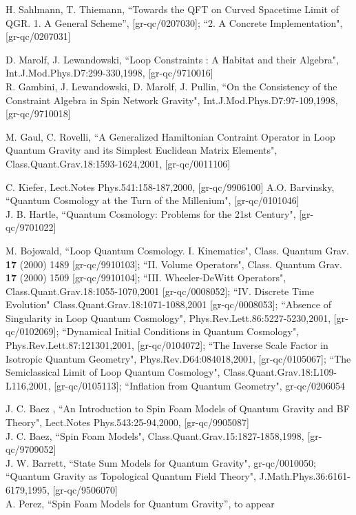 \documentclass[12pt]{report}
\begin{document}
\begin{thebibliography}{99}
 H. Sahlmann, T. Thiemann, ``Towards the QFT on 
Curved Spacetime Limit of QGR. 1. A General Scheme'', [gr-qc/0207030];
``2. A Concrete Implementation", [gr-qc/0207031]  

 D. Marolf, J. Lewandowski, ``Loop Constraints : A Habitat
and their Algebra", Int.J.Mod.Phys.D7:299-330,1998, [gr-qc/9710016]\\
R. Gambini, J. Lewandowski, D. Marolf, J. Pullin, ``On the
Consistency of the Constraint Algebra in Spin Network Gravity",
Int.J.Mod.Phys.D7:97-109,1998, [gr-qc/9710018]

M. Gaul, C. Rovelli, ``A Generalized Hamiltonian Contraint
Operator in Loop Quantum Gravity and its Simplest Euclidean Matrix Elements",
Class.Quant.Grav.18:1593-1624,2001, [gr-qc/0011106]

 C. Kiefer, 
Lect.Notes Phys.541:158-187,2000, [gr-qc/9906100]
A.O. Barvinsky, ``Quantum Cosmology at the Turn of the Millenium", 
[gr-qc/0101046]\\
J. B. Hartle, ``Quantum Cosmology: Problems for the 21st Century",
[gr-qc/9701022]

 M. Bojowald, ``Loop Quantum Cosmology. I. Kinematics",
Class. Quantum Grav. {\bf 17} (2000) 1489 [gr-qc/9910103];
``II. Volume Operators", Class. Quantum Grav. {\bf 17} (2000) 1509 
[gr-qc/9910104];
``III. Wheeler-DeWitt Operators",
Class.Quant.Grav.18:1055-1070,2001 [gr-qc/0008052];
``IV. Discrete Time Evolution"    
Class.Quant.Grav.18:1071-1088,2001 [gr-qc/0008053];
``Absence of Singularity in Loop Quantum Cosmology",
Phys.Rev.Lett.86:5227-5230,2001, [gr-qc/0102069];
``Dynamical Initial Conditions in Quantum Cosmology",
Phys.Rev.Lett.87:121301,2001, [gr-qc/0104072];
``The Inverse Scale Factor in Isotropic Quantum Geometry",
Phys.Rev.D64:084018,2001, [gr-qc/0105067];
``The Semiclassical Limit of Loop Quantum
Cosmology", Class.Quant.Grav.18:L109-L116,2001, [gr-qc/0105113];
``Inflation from Quantum Geometry", gr-qc/0206054 

J. C. Baez , ``An Introduction to Spin Foam Models of Quantum Gravity
and BF Theory", Lect.Notes Phys.543:25-94,2000, [gr-qc/9905087]\\  
J. C. Baez, ``Spin Foam Models", Class.Quant.Grav.15:1827-1858,1998,
[gr-qc/9709052]\\
J. W. Barrett, ``State Sum Models for Quantum Gravity", gr-qc/0010050;
``Quantum Gravity as Topological Quantum Field Theory",
J.Math.Phys.36:6161-6179,1995, [gr-qc/9506070]\\
A. Perez, ``Spin Foam Models for Quantum Gravity'', to appear


\end{thebibliography}
\end{document}
